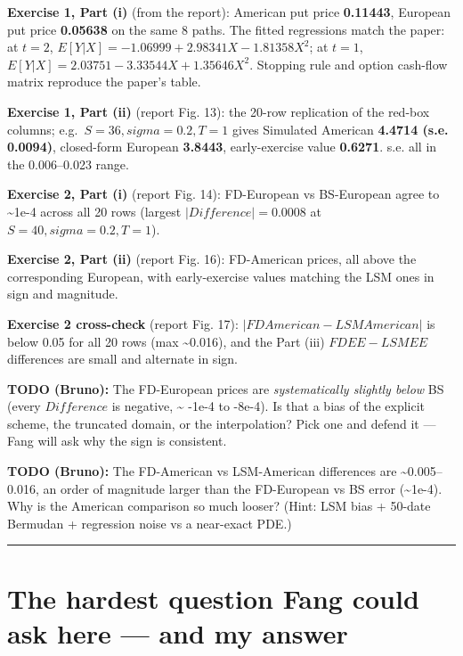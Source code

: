 \documentclass[
  11pt,
]{article}
\begin{document}
\textbf{Exercise 1, Part (i)} (from the report): American put price
\textbf{0.11443}, European put price \textbf{0.05638} on the same 8
paths. The fitted regressions match the paper: at \(t=2\),
\(E[Y|X] = -1.06999 + 2.98341 X - 1.81358 X^2\); at \(t=1\),
\(E[Y|X] = 2.03751 - 3.33544 X + 1.35646 X^2\). Stopping rule and option
cash-flow matrix reproduce the paper's table.

\textbf{Exercise 1, Part (ii)} (report Fig. 13): the 20-row replication
of the red-box columns; e.g.~\(S=36, sigma=0.2, T=1\) gives Simulated
American \textbf{4.4714 (s.e. 0.0094)}, closed-form European
\textbf{3.8443}, early-exercise value \textbf{0.6271}. s.e. all in the
0.006--0.023 range.

\textbf{Exercise 2, Part (i)} (report Fig. 14): FD-European vs
BS-European agree to \textasciitilde1e-4 across all 20 rows (largest
\(|Difference| = 0.0008\) at \(S=40, sigma=0.2, T=1\)).

\textbf{Exercise 2, Part (ii)} (report Fig. 16): FD-American prices, all
above the corresponding European, with early-exercise values matching
the LSM ones in sign and magnitude.

\textbf{Exercise 2 cross-check} (report Fig. 17):
\(|FD American - LSM American|\) is below 0.05 for all 20 rows (max
\textasciitilde0.016), and the Part (iii) \(FD EE - LSM EE\) differences
are small and alternate in sign.

\textbf{TODO (Bruno):} The FD-European prices are \emph{systematically
slightly below} BS (every \(Difference\) is negative, \textasciitilde{}
-1e-4 to -8e-4). Is that a bias of the explicit scheme, the truncated
domain, or the interpolation? Pick one and defend it --- Fang will ask
why the sign is consistent.

\textbf{TODO (Bruno):} The FD-American vs LSM-American differences are
\textasciitilde0.005--0.016, an order of magnitude larger than the
FD-European vs BS error (\textasciitilde1e-4). Why is the American
comparison so much looser? (Hint: LSM bias + 50-date Bermudan +
regression noise vs a near-exact PDE.)

\begin{center}\rule{0.5\linewidth}{0.5pt}\end{center}

\hypertarget{the-hardest-question-fang-could-ask-here-and-my-answer}{%
\section{The hardest question Fang could ask here --- and my
answer}\label{the-hardest-question-fang-could-ask-here-and-my-answer}}
\end{document}
